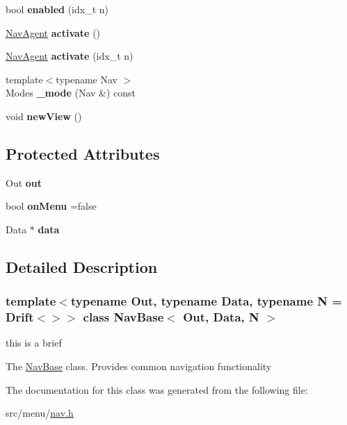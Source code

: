 \begin{DoxyCompactItemize}
bool {\bfseries enabled} (idx\+\_\+t n)
\item 
\mbox{\label{classNavBase_afb2043d9a01f2eaf2e63b141ef274ac8}} 
\hyperlink{structNavAgent}{Nav\+Agent} {\bfseries activate} ()
\item 
\mbox{\label{classNavBase_a002c7684845c794af4a658038cac82a8}} 
\hyperlink{structNavAgent}{Nav\+Agent} {\bfseries activate} (idx\+\_\+t n)
\item 
\mbox{\label{classNavBase_a78ee58dfb40948b707b46f08356673b3}} 
{\footnotesize template$<$typename Nav $>$ }\\Modes {\bfseries \+\_\+mode} (Nav \&) const
\item 
\mbox{\label{classNavBase_ac4099dc2d5b669a76e39f34262cb94e4}} 
void {\bfseries new\+View} ()
\end{DoxyCompactItemize}
\subsection*{Protected Attributes}
\begin{DoxyCompactItemize}
\item 
\mbox{\label{classNavBase_a3a207a77e441e240990f62aa516ed24b}} 
Out {\bfseries out}
\item 
\mbox{\label{classNavBase_ab3dccc3921900db56caa93a4c4324e36}} 
bool {\bfseries on\+Menu} =false
\item 
\mbox{\label{classNavBase_a6964003e5456d613172ed362d6c4a632}} 
Data $\ast$ {\bfseries data}
\end{DoxyCompactItemize}


\subsection{Detailed Description}
\subsubsection*{template$<$typename Out, typename Data, typename N = Drift$<$$>$$>$\newline
class Nav\+Base$<$ Out, Data, N $>$}

this is a brief 

The \hyperlink{classNavBase}{Nav\+Base} class. Provides common navigation functionality 

The documentation for this class was generated from the following file\+:\begin{DoxyCompactItemize}
\item 
src/menu/\hyperlink{nav_8h}{nav.\+h}\end{DoxyCompactItemize}
